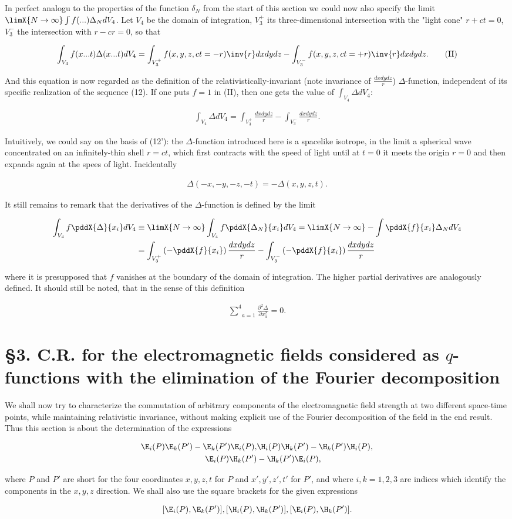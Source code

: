\documentclass{article}
\newcommand{\nequ}[2]{
\begin{align*}
#1
\tag{#2}
\end{align*}
}
\newcommand{\uequ}[1]{
\begin{align*}
#1
\end{align*}
}
\newcommand{\sumXY}[2]{\underset{#1}{\overset{#2}{\sum}}}
\begin{document}
In perfect analogu to the properties of the function $\delta_N$ from the start of this section we could now also specify the limit $\limX{N\to\infty}\int f(...)\Delta_N dV_4$. Let $V_4$ be the domain of integration, $V_3^+$ its three-dimensional intersection with the "light cone" $r+ct=0$, $V_3^-$ the intersection with $r-cr=0$, so that
\nequ{
\int_{V_4} f(x...t)\Delta(x...t)dV_4 =
 \int_{V_3^+}f(x,y,z,ct=-r)\inv{r} dx dy dz -
 \int_{V_3^-}f(x,y,z,ct=+r)\inv{r} dx dy dz.
}{II}
And this equation is now regarded as the definition of the relativistically-invariant (note invariance of $\frac{dx dy dz}{r}$) $\Delta$-function, independent of its specific realization of the sequence (12). If one puts $f=1$ in (II), then one gets the value of $\int_{V_4} \Delta dV_4$:
\nequ{
\int_{V_4} \Delta dV_4 = \int_{V_3^+}\frac{dx dy dz}{r} - \int_{V_3^-}\frac{dx dy dz}{r}.
}{II'}
Intuitively, we could say on the basis of (12'): the $\Delta$-function introduced here is a spacelike isotrope, in the limit a spherical wave concentrated on an infinitely-thin shell $r=ct$, which first contracts with the speed of light until at $t=0$ it meets the origin $r=0$ and then expands again at the spees of light. Incidentally
\nequ{
\Delta(-x,-y,-z,-t)=-\Delta(x,y,z,t).
}{13}

It still remains to remark that the derivatives of the $\Delta$-function is defined by the limit
\uequ{
\int_{V_4}f\pddX{\Delta}{x_i}dV_4 &\equiv 
\limX{N\to\infty}\int_{V_4}f\pddX{\Delta_N}{x_i}dV_4 =
\limX{N\to\infty}-\int\pddX{f}{x_i}\Delta_N dV_4 \\
&= \int_{V^+_3}\left(-\pddX{f}{x_i}\right)\frac{dx dy dz}{r}
- \int_{V^-_3}\left(-\pddX{f}{x_i}\right)\frac{dx dy dz}{r}
}
where it is presupposed that $f$ vanishes at the boundary of the domain of integration. The higher partial derivatives are analogously defined. It should still be noted, that in the sense of this definition
\nequ{
\sumXY{a=1}{4}\frac{\partial^2\Delta}{\partial x_a^2} = 0.
}{14}

\section*{§3. C.R. for the electromagnetic fields considered as $q$-functions with the elimination of the Fourier decomposition}
We shall now try to characterize the commutation of arbitrary components of the electromagnetic field strength at two different space-time points, while maintaining relativistic invariance, without making explicit use of the Fourier decomposition of the field in the end result. Thus this section is about the determination of the expressions
\uequ{
\E_i(P)\E_k(P') - \E_k(P')\E_i(P),& \H_i(P)\H_k(P') - \H_k(P')\H_i(P), \\
\E_i(P)\H_k(P') &- \H_k(P')\E_i(P), 
}
where $P$ and $P'$ are short for the four coordinates $x,y,z,t$ for $P$ and $x',y',z',t'$ for $P'$, and where $i,k=1,2,3$ are indices which identify the components in the $x,y,z$ direction. We shall also use the square brackets for the given expressions
\uequ{
[\E_i(P),\E_k(P')], [\H_i(P),\H_k(P')], [\E_i(P),\H_k(P')].
}
\end{document}
